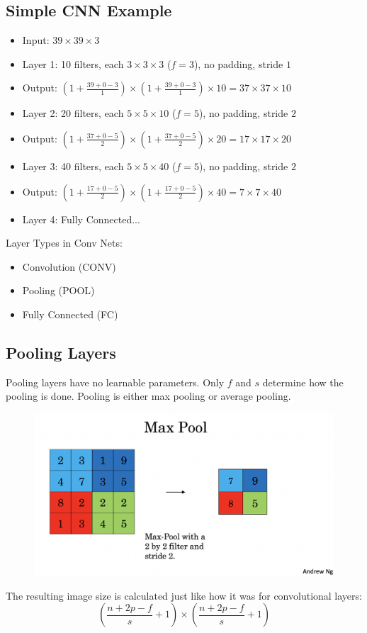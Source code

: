 \subsection{Simple CNN Example}
\begin{itemize}
    \item Input: $39\times 39\times 3$
    \item Layer 1: 10 filters, each $3\times 3\times 3$ ($f=3$), no padding, stride $1$
    \item Output: $(1+\frac{39+0-3}{1}) \times (1+\frac{39+0-3}{1}) \times 10 = 37\times 37\times 10$
    \item Layer 2: 20 filters, each $5\times 5\times 10$ ($f=5$), no padding, stride $2$
    \item Output: $(1+\frac{37+0-5}{2}) \times (1+\frac{37+0-5}{2}) \times 20 = 17\times 17\times 20$
    \item Layer 3: 40 filters, each $5\times 5\times 40$ ($f=5$), no padding, stride $2$
    \item Output: $(1+\frac{17+0-5}{2}) \times (1+\frac{17+0-5}{2}) \times 40 = 7\times 7\times 40$
    \item Layer 4: Fully Connected...
\end{itemize} 

Layer Types in Conv Nets: 
\begin{itemize}
    \item Convolution (CONV)
    \item Pooling (POOL)
    \item Fully Connected (FC)
\end{itemize}

\subsection{Pooling Layers}

Pooling layers have no learnable parameters. Only $f$ and $s$ determine
how the pooling is done. Pooling is either max pooling or average pooling. 

\begin{figure}[H]
    \includegraphics[scale=0.4]{images/maxpool.png}
    \centering
\end{figure}

The resulting image size is calculated just like how it was 
for convolutional layers: 
$$
(\frac{n+2p-f}{s} + 1) \times (\frac{n+2p-f}{s} + 1)
$$